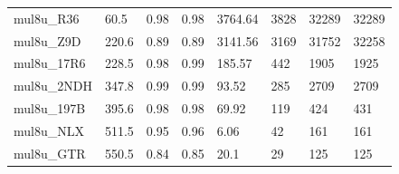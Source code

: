 \begin{table}[H]
{\begin{tabular}{|l|l|ll|ll|ll|}
mul8u\_R36         & 60.5            & \multicolumn{1}{l|}{0.98}                            & 0.98                                    & \multicolumn{1}{l|}{3764.64}                            & 3828                                    & \multicolumn{1}{l|}{32289}                             & 32289                                    \\
mul8u\_Z9D         & 220.6           & \multicolumn{1}{l|}{0.89}                            & 0.89                                    & \multicolumn{1}{l|}{3141.56}                            & 3169                                    & \multicolumn{1}{l|}{31752}                             & 32258                                    \\
mul8u\_17R6        & 228.5           & \multicolumn{1}{l|}{0.98}                            & 0.99                                    & \multicolumn{1}{l|}{185.57}                             & 442                                     & \multicolumn{1}{l|}{1905}                              & 1925                                     \\
mul8u\_2NDH        & 347.8           & \multicolumn{1}{l|}{0.99}                            & 0.99                                    & \multicolumn{1}{l|}{93.52}                              & 285                                     & \multicolumn{1}{l|}{2709}                              & 2709                                     \\
mul8u\_197B        & 395.6           & \multicolumn{1}{l|}{0.98}                            & 0.98                                    & \multicolumn{1}{l|}{69.92}                              & 119                                     & \multicolumn{1}{l|}{424}                               & 431                                      \\
mul8u\_NLX         & 511.5           & \multicolumn{1}{l|}{0.95}                            & 0.96                                    & \multicolumn{1}{l|}{6.06}                               & 42                                      & \multicolumn{1}{l|}{161}                               & 161                                      \\
mul8u\_GTR         & 550.5           & \multicolumn{1}{l|}{0.84}                            & 0.85                                    & \multicolumn{1}{l|}{20.1}                               & 29                                      & \multicolumn{1}{l|}{125}                               & 125                                      \\

\end{tabular}}
\end{table}
